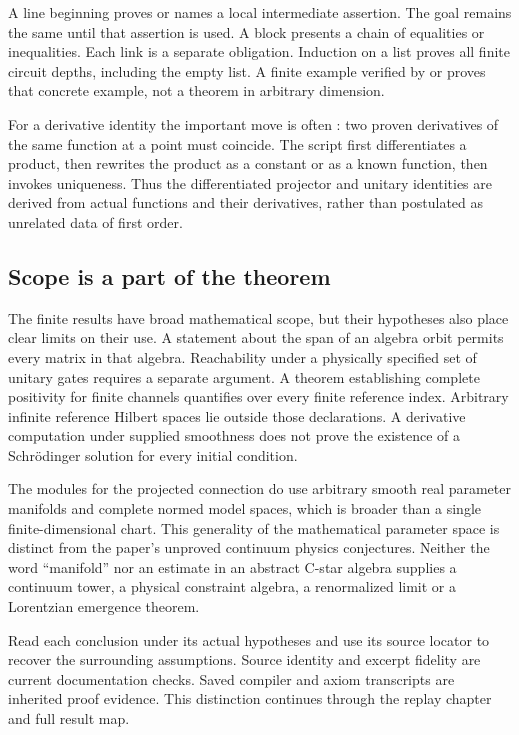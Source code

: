 A line beginning  proves or names a local intermediate assertion. The goal remains the same until that assertion is used. A  block presents a chain of equalities or inequalities. Each link is a separate obligation. Induction on a list proves all finite circuit depths, including the empty list. A finite example verified by  or  proves that concrete example, not a theorem in arbitrary dimension.

For a derivative identity the important move is often : two proven derivatives of the same function at a point must coincide. The script first differentiates a product, then rewrites the product as a constant or as a known function, then invokes uniqueness. Thus the differentiated projector and unitary identities are derived from actual functions and their derivatives, rather than postulated as unrelated data of first order.

\subsection{Scope is a part of the theorem}
The finite results have broad mathematical scope, but their hypotheses also place clear limits on their use. A statement about the span of an algebra orbit permits every matrix in that algebra. Reachability under a physically specified set of unitary gates requires a separate argument. A theorem establishing complete positivity for finite channels quantifies over every finite reference index. Arbitrary infinite reference Hilbert spaces lie outside those declarations. A derivative computation under supplied smoothness does not prove the existence of a Schrödinger solution for every initial condition.

The modules for the projected connection do use arbitrary smooth real parameter manifolds and complete normed model spaces, which is broader than a single finite-dimensional chart. This generality of the mathematical parameter space is distinct from the paper's unproved continuum physics conjectures. Neither the word ``manifold'' nor an estimate in an abstract C-star algebra supplies a continuum tower, a physical constraint algebra, a renormalized limit or a Lorentzian emergence theorem.

Read each conclusion under its actual hypotheses and use its source locator to recover the surrounding assumptions. Source identity and excerpt fidelity are current documentation checks. Saved compiler and axiom transcripts are inherited proof evidence. This distinction continues through the replay chapter and full result map.
